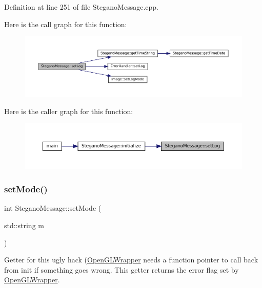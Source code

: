 Definition at line 251 of file Stegano\+Message.\+cpp.

Here is the call graph for this function\+:\nopagebreak
\begin{figure}[H]
\begin{center}
\leavevmode
\includegraphics[width=350pt]{classSteganoMessage_a438e9d5189a8e3b83021fada4a6a469c_cgraph}
\end{center}
\end{figure}
Here is the caller graph for this function\+:\nopagebreak
\begin{figure}[H]
\begin{center}
\leavevmode
\includegraphics[width=350pt]{classSteganoMessage_a438e9d5189a8e3b83021fada4a6a469c_icgraph}
\end{center}
\end{figure}
\mbox{\label{classSteganoMessage_a3e06a73baa5744b5eb9152f4ae65f458}} 
\subsubsection{\texorpdfstring{setMode()}{setMode()}}
{\footnotesize\ttfamily int Stegano\+Message\+::set\+Mode (\begin{DoxyParamCaption}\item[{std\+::string}]{m }\end{DoxyParamCaption})}



Getter for this ugly hack (\mbox{\hyperlink{classOpenGLWrapper}{Open\+G\+L\+Wrapper}} needs a function pointer to call back from init if something goes wrong. This getter returns the error flag set by \mbox{\hyperlink{classOpenGLWrapper}{Open\+G\+L\+Wrapper}}. 

